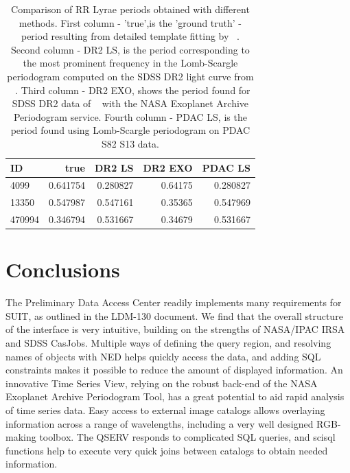 \documentclass[DM,lsstdraft,toc,usenatbib]{lsstdoc}
\begin{document}
\begin{table}
\centering
\caption{Comparison of RR Lyrae periods obtained with different methods. First column - 'true',is the 'ground truth' -  period resulting from detailed template fitting by ~\citep{sesar2010}. Second column - DR2 LS, is the period corresponding to the most prominent frequency in the Lomb-Scargle periodogram  computed on the SDSS DR2 light curve from ~\citep{sesar2010}. Third column - DR2 EXO, shows the period found for SDSS DR2 data of  ~\citep{sesar2010}  with the NASA Exoplanet Archive Periodogram service.  Fourth column - PDAC LS, is the period found using Lomb-Scargle periodogram  on PDAC S82 S13 data.}
\label{tab:periods}
\begin{tabular}{ l|rrrr } 
\hline
 ID      & true        & DR2 LS      & DR2 EXO      &  PDAC LS  \\ 
\hline
 4099    & 0.641754     & 0.280827   & 0.64175      &  0.280827 \\ 
 13350   & 0.547987     & 0.547161   & 0.35365      &  0.547969  \\ 
 470994  & 0.346794     & 0.531667   & 0.34679      &  0.531667  \\ 
\end{tabular}
\end{table}







\section{Conclusions}

The Preliminary Data Access Center readily implements  many requirements for SUIT, as outlined in the LDM-130 document. We find that the overall structure of the interface is very intuitive, building on the strengths of NASA/IPAC IRSA and SDSS CasJobs. Multiple ways of defining the query region, and resolving names of objects with NED helps quickly access the data, and adding SQL constraints makes it possible to reduce the amount of displayed information.  An innovative Time Series View,  relying on the robust back-end of the NASA Exoplanet Archive Periodogram Tool,  has a great potential to aid rapid analysis of time series data.  Easy access to external image catalogs allows overlaying information across a range of wavelengths, including a very well designed RGB-making  toolbox. The QSERV responds to complicated SQL queries, and scisql functions help to execute very quick joins between catalogs to obtain needed information. 
\end{document}

